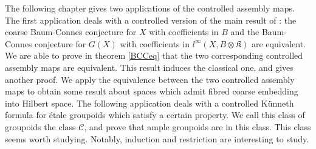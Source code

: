 The following chapter gives two applications of the controlled assembly maps. The first application deals with a controlled version of the main result of \cite{SkTuYu} : the coarse Baum-Connes conjecture for $X$ with coefficients in $B$ and the Baum-Connes conjecture for $G(X)$ with coefficients in $l^\infty (X, B\otimes\mathfrak K)$ are equivalent. We are able to prove in theorem \ref{BCCeq} that the two corresponding controlled assembly maps are equivalent. This result induces the classical one, and gives another proof. We apply the equivalence between the two controlled assembly maps to obtain some result about spaces which admit fibred coarse embedding into Hilbert space. The following application deals with a controlled Künneth formula for étale groupoids which satisfy a certain property. We call this class of groupoids the class $\mathcal C$, and prove that ample groupoids are in this class. This class seems worth studying. Notably, induction and restriction are interesting to study. \\  












































